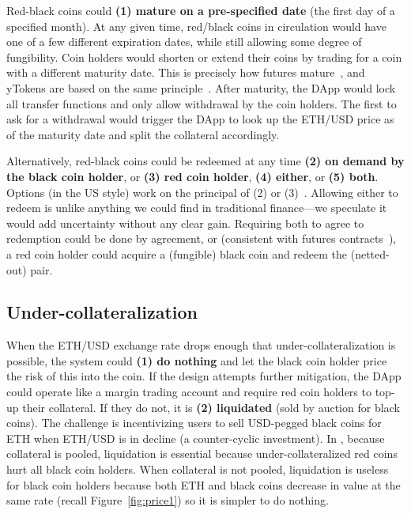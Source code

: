  Red-black coins could \textbf{(1) mature on a pre-specified date} (\eg the first day of a specified month). At any given time, red/black coins in circulation would have one of a few different expiration dates, while still allowing some degree of fungibility. Coin holders would shorten or extend their coins by trading for a coin with a different maturity date. This is precisely how futures  mature~\cite{Har03}, and yTokens are based on the same principle~\cite{RoNi20}. After maturity, the DApp would lock all transfer functions and only allow withdrawal by the coin holders. The first to ask for a withdrawal would trigger the DApp to look up the ETH/USD price as of the maturity date and split the collateral accordingly. 

Alternatively, red-black coins could be redeemed at any time \textbf{(2) on demand by the black coin holder}, or \textbf{(3) red coin holder}, \textbf{(4) either}, or \textbf{(5) both}. Options (in the US style) work on the principal of (2) or (3)~\cite{Har03,Sey09}. Allowing either to redeem is unlike anything we could find in traditional finance---we speculate it would add uncertainty without any clear gain. Requiring both to agree to redemption could be done by agreement, or (consistent with futures contracts~\cite{Har03}), a red coin holder could acquire a (fungible) black coin and redeem the (netted-out) pair.


\subsection{Under-collateralization}

When the ETH/USD exchange rate drops enough that under-collateralization is possible, the system could \textbf{(1) do nothing} and let the black coin holder price the risk of this into the coin. If the design attempts further mitigation, the DApp could operate like a margin trading account and require red coin holders to top-up their collateral. If they do not, it is \textbf{(2) liquidated} (\eg sold by auction for black coins). The challenge is incentivizing users to sell USD-pegged black coins for ETH when ETH/USD is in decline (a counter-cyclic investment). In \dai, because collateral is pooled, liquidation is essential because under-collateralized red coins hurt all black coin holders. When collateral is not pooled, liquidation is useless for black coin holders because both ETH and black coins decrease in value at the same rate (recall Figure~\ref{fig:price1}) so it is simpler to do nothing.

